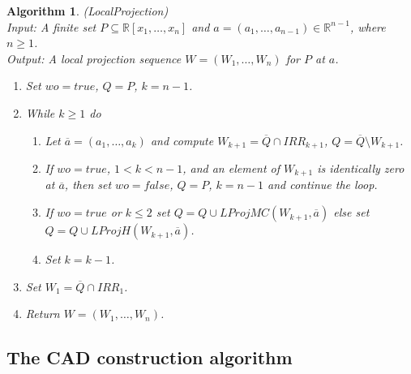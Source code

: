 \documentclass[english]{amsart}
\numberwithin{equation}{section}
\numberwithin{figure}{section}
\newtheorem{algorithm}[thm]{Algorithm}
\begin{document}
\begin{algorithm}
\label{alg:LocalProj}(LocalProjection)\\
Input:\emph{ A finite set }$P\subseteq\mathbb{R}[x_{1},\ldots,x_{n}]$
\emph{and }$a=(a_{1},\ldots,a_{n-1})\in\mathbb{R}^{n-1}$\emph{, where
$n\geq1$.}\textup{}\\
\textup{\emph{Output:}}\textup{ A local projection sequence} $W=(W_{1},\ldots,W_{n})$
\emph{for $P$ at $a$.}\textup{ }
\begin{enumerate}
\item Set $wo=true$, $Q=P$, $k=n-1$.
\item While $k\geq1$ do

\begin{enumerate}
\item Let $\overline{a}=(a_{1},\ldots,a_{k})$ and compute $W_{k+1}=\overline{Q}\cap IRR_{k+1}$,
$Q=\overline{Q}\setminus W_{k+1}$.
\item If $wo=true$, $1<k<n-1$, and an element of $W_{k+1}$ is identically
zero at $\overline{a}$, then set $wo=false$, $Q=P$, $k=n-1$ and
continue the loop.
\item If $wo=true$ or $k\leq2$ set $Q=Q\cup LProjMC(W_{k+1},\overline{a})$
else set $Q=Q\cup LProjH(W_{k+1},\overline{a})$.
\item Set $k=k-1$.
\end{enumerate}
\item Set $W_{1}=\overline{Q}\cap IRR_{1}$.
\item Return $W=(W_{1},\ldots,W_{n})$.
\end{enumerate}
\end{algorithm}

\subsection{The CAD construction algorithm}
\end{document}
